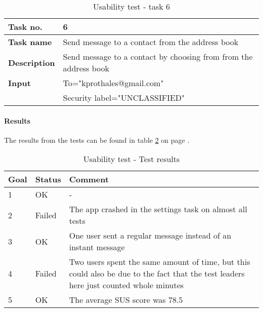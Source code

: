 		\begin{table}
\begin{center}
			\begin{tabular}{>{\bfseries}l|l}\hline
				Task no.&6\\ \hline
				Task name&Send message to a contact from the address book\\ \hline
				Description&Send message to a contact by choosing from from the address book\\ \hline
				Input&To="kprothales@gmail.com"\\
					&Security label="UNCLASSIFIED"\\ \hline
			\end{tabular}
\end{center}
			\caption{Usability test - task 6} \label{tab:usabilitytask6}
		\end{table}

\newpage

\paragraph{Results}\hfill
\newline
			The results from the tests can be found in table \ref{tab:usabilitytestresults} on page \pageref{tab:usabilitytestresults}.
			\begin{table}[h!]
\begin{center}
			\begin{tabular}{l|l|p{8cm}}	\hline
				\textbf{Goal}&\textbf{Status}&\textbf{Comment}\\ \hline \hline
				1&OK&-\\ \hline
				2&Failed&The app crashed in the settings task on almost all tests\\ \hline
				3&OK&One user sent a regular message instead of an instant message\\ \hline
				4&Failed&Two users spent the same amount of time, but this could also be due to the fact that the test leaders here just counted whole minutes\\ \hline
				5&OK&The average SUS score was 78.5\\ \hline 

			\end{tabular}
\end{center}
			\caption{Usability test - Test results} \label{tab:usabilitytestresults}
		\end{table}

